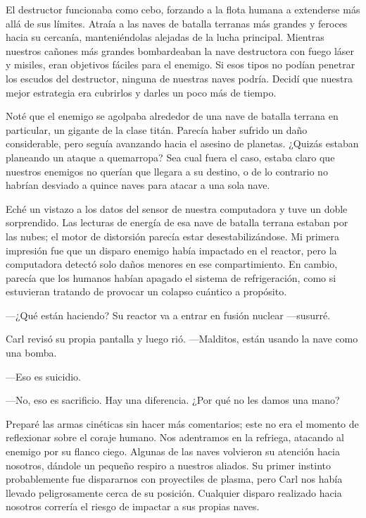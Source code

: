 \documentclass[spanish,12pt,a4paper,oneside,titlepage]{book}
\begin{document}
    El destructor funcionaba como cebo, forzando a la flota humana a extenderse más allá de sus límites. Atraía a las naves de batalla terranas más grandes y feroces hacia su cercanía, manteniéndolas alejadas de la lucha principal. Mientras nuestros cañones más grandes bombardeaban la nave destructora con fuego láser y misiles, eran objetivos fáciles para el enemigo. Si esos tipos no podían penetrar los escudos del destructor, ninguna de nuestras naves podría. Decidí que nuestra mejor estrategia era cubrirlos y darles un poco más de tiempo.

    Noté que el enemigo se agolpaba alrededor de una nave de batalla terrana en particular, un gigante de la clase titán. Parecía haber sufrido un daño considerable, pero seguía avanzando hacia el asesino de planetas. ¿Quizás estaban planeando un ataque a quemarropa? Sea cual fuera el caso, estaba claro que nuestros enemigos no querían que llegara a su destino, o de lo contrario no habrían desviado a quince naves para atacar a una sola nave.

    Eché un vistazo a los datos del sensor de nuestra computadora y tuve un doble sorprendido. Las lecturas de energía de esa nave de batalla terrana estaban por las nubes; el motor de distorsión parecía estar desestabilizándose. Mi primera impresión fue que un disparo enemigo había impactado en el reactor, pero la computadora detectó solo daños menores en ese compartimiento. En cambio, parecía que los humanos habían apagado el sistema de refrigeración, como si estuvieran tratando de provocar un colapso cuántico a propósito.

    —¿Qué están haciendo? Su reactor va a entrar en fusión nuclear —susurré.

    Carl revisó su propia pantalla y luego rió. —Malditos, están usando la nave como una bomba.

    —Eso es suicidio.

    —No, eso es sacrificio. Hay una diferencia. ¿Por qué no les damos una mano?

    Preparé las armas cinéticas sin hacer más comentarios; este no era el momento de reflexionar sobre el coraje humano. Nos adentramos en la refriega, atacando al enemigo por su flanco ciego. Algunas de las naves volvieron su atención hacia nosotros, dándole un pequeño respiro a nuestros aliados. Su primer instinto probablemente fue dispararnos con proyectiles de plasma, pero Carl nos había llevado peligrosamente cerca de su posición. Cualquier disparo realizado hacia nosotros correría el riesgo de impactar a sus propias naves.
\end{document}
